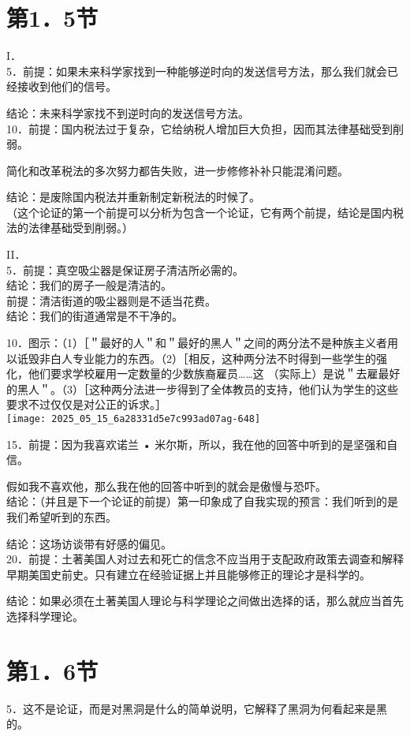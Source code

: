 \section*{第1．5节}
I．\\
5．前提：如果未来科学家找到一种能够逆时向的发送信号方法，那么我们就会已经接收到他们的信号。

结论：未来科学家找不到逆时向的发送信号方法。\\
10．前提：国内税法过于复杂，它给纳税人增加巨大负担，因而其法律基础受到削弱。

简化和改革税法的多次努力都告失败，进一步修修补补只能混淆问题。

结论：是废除国内税法并重新制定新税法的时候了。\\
（这个论证的第一个前提可以分析为包含一个论证，它有两个前提，结论是国内税法的法律基础受到削弱。）

II．\\
5．前提：真空吸尘器是保证房子清洁所必需的。\\
结论：我们的房子一般是清洁的。\\
前提：清洁街道的吸尘器则是不适当花费。\\
结论：我们的街道通常是不干净的。

10．图示：（1）［＂最好的人＂和＂最好的黑人＂之间的两分法不是种族主义者用以诋毁非白人专业能力的东西。（2）［相反，这种两分法不时得到一些学生的强化，他们要求学校雇用一定数量的少数族裔雇员……这 （实际上）是说＂去雇最好的黑人＂。（3）［这种两分法进一步得到了全体教员的支持，他们认为学生的这些要求不过仅仅是对公正的诉求。］\\
\texttt{[image: 2025\_05\_15\_6a28331d5e7c993ad07ag-648]}

15．前提：因为我喜欢诺兰 • 米尔斯，所以，我在他的回答中听到的是坚强和自信。

假如我不喜欢他，那么我在他的回答中听到的就会是傲慢与恐吓。\\
结论：（并且是下一个论证的前提）第一印象成了自我实现的预言：我们听到的是我们希望听到的东西。

结论：这场访谈带有好感的偏见。\\
20．前提：土著美国人对过去和死亡的信念不应当用于支配政府政策去调查和解释早期美国史前史。只有建立在经验证据上并且能够修正的理论才是科学的。

结论：如果必须在土著美国人理论与科学理论之间做出选择的话，那么就应当首先选择科学理论。

\section*{第1．6节}
5．这不是论证，而是对黑洞是什么的简单说明，它解释了黑洞为何看起来是黑的。

